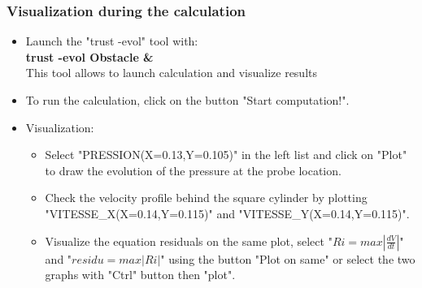 \documentclass[10pt, hyperref={unicode=true,pdfusetitle, bookmarks=true,bookmarksnumbered=false,bookmarksopen=false, breaklinks=false,pdfborder={0 0l 1},backref=true,colorlinks=true,linkcolor=darkblue,pageanchor}]{beamer}
\begin{document}
\begin{frame}
\frametitle{Visualization during the calculation}
\begin{block}{}

\begin{itemize}

\item Launch the "trust -evol" tool with: \\
\textbf{trust -evol Obstacle \&} \\
This tool allows to launch calculation and visualize results

\item To run the calculation, click on the button "Start computation!".

\item Visualization:
    \begin{itemize}
    \item [$\circ$] Select "PRESSION(X=0.13,Y=0.105)" in the left list  and click on "Plot" to draw the evolution of the pressure at the probe location.
    \item [$\circ$] Check the velocity profile behind the square cylinder by plotting "VITESSE\_X(X=0.14,Y=0.115)" and "VITESSE\_Y(X=0.14,Y=0.115)".
    \item [$\circ$] Visualize the equation residuals on the same plot, select "$ Ri = max \left| \frac{dV}{dt} \right|$" and "$residu = max \left| Ri \right|$" using the button "Plot on same" or select the two graphs with "Ctrl" button then "plot".
    \end{itemize}

\end{itemize}


\end{block}
\end{frame}
\end{document}
